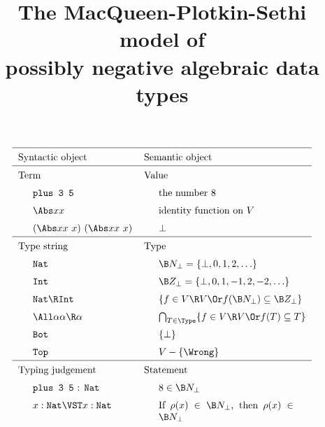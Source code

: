 \documentclass{amsart}
\title[The MPS model of possibly negative algebraic data types]
{The MacQueen-Plotkin-Sethi model of
\\
possibly negative algebraic data types}
\begin{document}
\maketitle

\def\thingsExpressibleInMpsModel{%
subtyping, universal types, union and intersection types,
recursive types, dependent types, and higher kinds%
}

\vfill

\[
\def\miniwidth{0.4\textwidth}
\renewcommand\arraystretch{1.5}
\begin{tabular}{ll}
\hline Syntactic object \hspace{1cm}\null& Semantic object \\


\hline Term & Value \\


\indent\texttt{plus 3 5} & \indent the number $8$ \\

\indent$\Abs x x$ & \indent identity function on $V$\\

\indent$(\Abs x x~x)~(\Abs x x~x)$ & \indent$\bot$ \\


\hline Type string & Type \\


\indent\texttt{Nat} & \indent$\B N_\bot = \{\bot,0,1,2,\ldots\}$ \\

\indent\texttt{Int} & \indent$\B Z_\bot = \{\bot, 0, 1, -1, 2, -2, \ldots\}$\\

\indent$\texttt{Nat}\R\texttt{Int}$ & \indent$\{f\in V\R V \Or f(\B N_\bot)\subseteq \B Z_\bot\}$ \\

\indent$\All\alpha\alpha\R\alpha$ & \indent$\bigcap_{T\in\Type}\{f\in V\R V \Or f(T) \subseteq T\}$ \\

\indent \texttt{Bot} & \indent $\{\bot\}$ \\

\indent \texttt{Top} & \indent $V-\{\Wrong\}$ \\


\hline Typing judgement & Statement \\


\indent\texttt{plus 3 5} : \texttt{Nat} & \indent$8\in\B N_\bot$ \\

\indent $x:\texttt{Nat}\VST x:\texttt{Nat}$ & \indent
\begin{minipage}[t]{\miniwidth}
If $\rho(x)\in\B N_\bot$, then $\rho(x)\in\B N_\bot$
\end{minipage}\\


\end{tabular}\]
\end{document}
